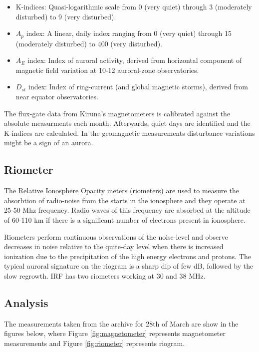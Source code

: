 \documentclass{article}
\begin{document}
\begin{itemize}
\item K-indices: Quasi-logarithmic scale from 0 (very quiet) through 3 (moderately disturbed) to 9 (very disturbed).
\item $A_p$ index: A linear, daily index ranging from 0 (very quiet) through 15 (moderately disturbed) to 400 (very disturbed).
\item $A_E$ index: Index of auroral activity, derived from horizontal component of magnetic field variation at 10-12 auroral-zone observatories.
\item $D_{st}$ index: Index of ring-current (and global magnetic storms), derived from near equator observatories.
\end{itemize}

The flux-gate data from Kiruna's magnetometers is calibrated against the absolute measurments each month. Afterwards, quiet days are identified and the K-indices are calculated. In the geomagnetic measurements disturbance variations might be a sign of an aurora.

\subsection{Riometer}
The Relative Ionosphere Opacity meters (riometers) are used to measure the absorbtion of radio-noise from the starts in the ionosphere and they operate at 25-50 Mhz frequency. Radio waves of this frequency are absorbed at the altitude of 60-110 km if there is a significant number of electrons present in ionosphere.

Riometers perform continuous observations of the noise-level and observe decreases in noise relative to the quite-day level when there is increased ionization due to the precipitation of the high energy electrons and protons. The typical auroral signature on the riogram is a sharp dip of few dB, followed by the slow regrowth. IRF has two riometers working at 30 and 38 MHz.

\subsection{Analysis}
The measurements taken from the archive for 28th of March are show in the figures below, where Figure \ref{fig:magnetometer} represents magnetometer measurements and Figure \ref{fig:riometer} represents riogram.
\end{document}
